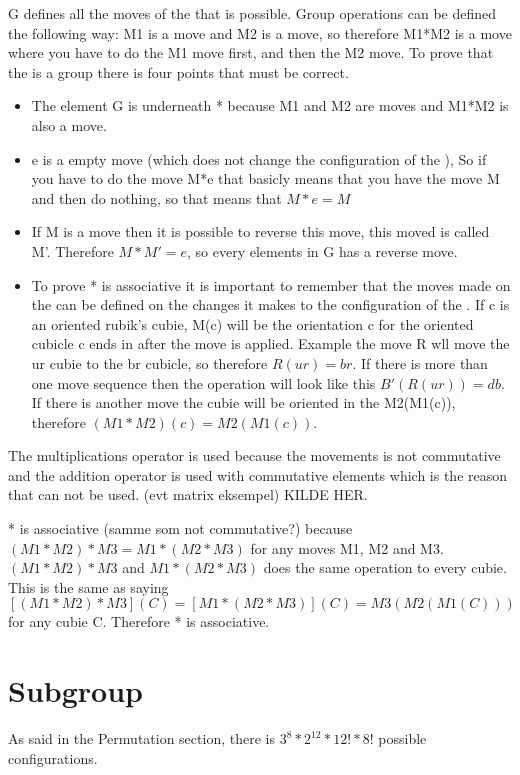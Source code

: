 G defines all the moves of the \rubik{} that is possible. Group operations can be defined the following way: M1 is a move and M2 is a move, so therefore M1*M2 is a move where you have to do the M1 move first, and then the M2 move. To prove that the \rubik{} is a group there is four points that must be correct.

\begin {itemize}
\item The element G is underneath * because M1 and M2 are moves  and M1*M2 is also a move.

\item e is a empty move (which does not change the configuration of the \rubik{}), So if you have to do the move M*e that basicly means that you have the move M and then do nothing, so that means that $M*e=M$

\item If M is a move then it is possible to reverse this move, this moved is called M'. Therefore $M*M' = e$, so every elements in G has a reverse move.

\item To prove * is associative it is important to remember that the moves made on the \rubik{} can be defined on the changes it makes to the configuration of the \rubik{}. 
If c is an oriented rubik's cubie, M(c) will be the orientation c for the oriented cubicle c ends in after the move is applied.
Example the move R wll move the ur cubie to the br cubicle, so therefore $R(ur)=br$. If there is more than one move sequence then the operation will look like this $B'(R(ur))=db$. If there is another move the cubie will be oriented in the M2(M1(c)), therefore $(M1*M2)(c)=M2(M1(c))$. 

\end {itemize}

The multiplications operator is used because the \rubik{} movements is not commutative and the addition operator is used with commutative elements which is the reason that can not be used. (evt matrix eksempel) KILDE HER.

* is associative (samme som not commutative?) because $(M1*M2)*M3 = M1*(M2*M3)$ for any moves M1, M2 and M3. $(M1*M2)*M3$ and $M1*(M2*M3)$ does the same operation to every cubie. This is the same as saying $[(M1*M2)*M3](C)=[M1*(M2*M3)](C)=M3(M2(M1(C)))$ for any cubie C. Therefore * is associative.

\section{Subgroup}
As said in the Permutation section, there is $3^8*2^{12}*12!*8!$ possible configurations.




